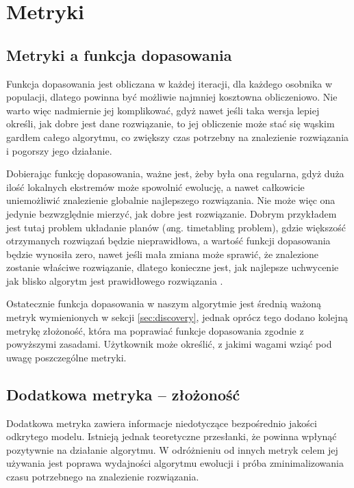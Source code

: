 \section{Metryki}
\label{sec:metryki}

\subsection{Metryki a funkcja dopasowania}

Funkcja dopasowania jest obliczana w każdej iteracji, dla każdego osobnika w populacji, dlatego powinna być możliwie najmniej kosztowna obliczeniowo. Nie warto więc nadmiernie jej komplikować, gdyż nawet jeśli taka wersja lepiej określi, jak dobre jest dane rozwiązanie, to jej obliczenie może stać się wąskim gardłem całego algorytmu, co zwiększy czas potrzebny na znalezienie rozwiązania i pogorszy jego działanie. 

Dobierając funkcję dopasowania, ważne jest, żeby była ona regularna, gdyż duża ilość lokalnych ekstremów może spowolnić ewolucję, a nawet całkowicie uniemożliwić znalezienie globalnie najlepszego rozwiązania.
Nie może więc ona jedynie bezwzględnie mierzyć, jak dobre jest rozwiązanie. Dobrym przykładem jest tutaj problem układanie planów (\textit ang. timetabling problem), gdzie większość otrzymanych rozwiązań będzie nieprawidłowa, a wartość funkcji dopasowania będzie wynosiła zero, nawet jeśli mała zmiana może sprawić, że znalezione zostanie właściwe rozwiązanie, dlatego konieczne jest, jak najlepsze uchwycenie jak blisko algorytm jest prawidłowego rozwiązania \cite{icga85:cramer, beasley:1993:ogapf}.

Ostatecznie funkcja dopasowania w naszym algorytmie jest średnią ważoną metryk wymienionych w sekcji \ref{sec:discovery}, jednak oprócz tego dodano kolejną metrykę złożoność, która ma poprawiać funkcje dopasowania zgodnie z powyższymi zasadami. Użytkownik może określić, z jakimi wagami wziąć pod uwagę poszczególne metryki.

\subsection{Dodatkowa metryka -- złożoność}
\label{sec:additional-metric-complexity}
Dodatkowa metryka zawiera informacje niedotyczące bezpośrednio jakości odkrytego modelu. Istnieją jednak  teoretyczne przesłanki, że powinna wpłynąć pozytywnie na działanie algorytmu. W odróżnieniu od innych metryk celem jej używania jest poprawa wydajności algorytmu ewolucji i próba zminimalizowania czasu potrzebnego na znalezienie rozwiązania.
 
